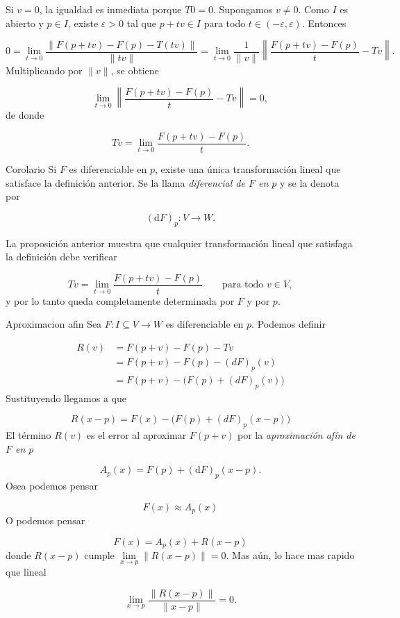\begin{bookproof}{}
Si $v=0$, la igualdad es inmediata porque $T0=0$. Supongamos $v \neq 0$. Como $I$ es abierto y $p \in I$, existe $\varepsilon>0$ tal que $p+tv \in I$ para todo $t \in (-\varepsilon,\varepsilon)$. Entonces

\[
0
= \lim_{t \to 0}
\frac{\|F(p+tv)-F(p)-T(tv)\|}{\|tv\|}
= \lim_{t \to 0}
\frac{1}{\|v\|}
\left\|\frac{F(p+tv)-F(p)}{t}-Tv\right\|.
\]
Multiplicando por $\|v\|$, se obtiene

\[
\lim_{t \to 0}\left\|\frac{F(p+tv)-F(p)}{t}-Tv\right\|=0,
\]
de donde

\[
Tv = \lim_{t \to 0} \frac{F(p+tv)-F(p)}{t}.
\]
\bookqed
\end{bookproof}
\begin{bookcorollary}{Corolario}
Si $F$ es diferenciable en $p$, existe una única transformación lineal que satisface la definición anterior. Se la llama \emph{diferencial de $F$ en $p$} y se la denota por

\[
(\mathrm{d}F)_p \colon V \to W.
\]
\end{bookcorollary}
\begin{bookproof}{}
La proposición anterior muestra que cualquier transformación lineal que satisfaga la definición debe verificar

\[
Tv = \lim_{t \to 0} \frac{F(p+tv)-F(p)}{t}
\qquad \text{para todo } v \in V,
\]
y por lo tanto queda completamente determinada por $F$ y por $p$.

\bookqed
\end{bookproof}
\begin{bookdefinition}{Aproximacion afin}
Sea $F \colon I \subseteq V \to W$ es diferenciable en $p$. Podemos definir

\[
\begin{aligned} R(v)&= F(p+v)-F(p)-Tv\\ & =  F(p+v)-F(p)-(dF)_{p}(v)\\&=F(p+v)-\bigg(F(p)+(dF)_{p}(v)\bigg)\end{aligned}
\]
Sustituyendo llegamos a que

\[
R(x-p)=F(x)-\bigg(F(p)+(dF)_{p}(x-p)\bigg)
\]
El término $R(v)$ es el error al aproximar $F(p+v)$ por la \emph{aproximación afín de $F$ en $p$}

\[
A_{p}(x)=F(p)+(\mathrm{d}F)_p(x-p).
\]
Osea podemos pensar

\[
F(x)\approx A_{p}(x)
\]
O podemos pensar

\[
F(x)=A_{p}(x)+R(x-p)
\]
donde $R(x-p)$ cumple $\lim\limits_{ x \to p }\lVert R(x-p) \rVert=0$. Mas aún, lo hace mas rapido que lineal

\[
\lim_{x\to p}\frac{\|R(x-p)\|}{\|x-p\|}=0.
\]
\end{bookdefinition}
